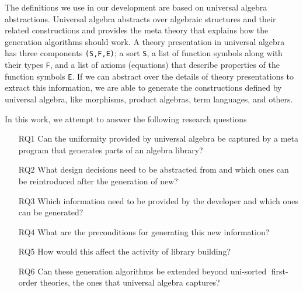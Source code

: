 The definitions we use in our development are based on universal algebra abstractions. Universal algebra abstracts over algebraic structures and their related constructions and provides the meta theory that explains how the generation algorithms should work. A theory presentation in universal algebra has three components \verb|(S,F,E)|; a sort \verb|S|, a list of function symbols along with their types \verb|F|, and a list of axioms (equations) that describe properties of the function symbols \verb|E|. If we can abstract over the details of theory presentations to extract this information, we are able to generate the constructions defined by universal algebra, like morphisms, product algebras, term languages, and others. 

In this work, we attempt to answer the following research questions 
\begin{enumerate}
    \item[RQ1] Can the uniformity provided by universal algebra be captured by a meta program that generates parts of an algebra library?
    \item[RQ2] What design decisions need to be abstracted from and which ones can be reintroduced after the generation of new?
    \item[RQ3] Which information need to be provided by the developer and which ones can be generated? 
    \item[RQ4] What are the preconditions for generating this new information? 
    \item[RQ5] How would this affect the activity of library building?
    \item[RQ6] Can these generation algorithms be extended beyond uni-sorted first-order theories, the ones that universal algebra captures? 
\end{enumerate}





